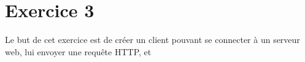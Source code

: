 \section{Exercice 3}
Le but de cet exercice est de créer un client pouvant se connecter à un serveur web, lui envoyer une requête HTTP, et %
